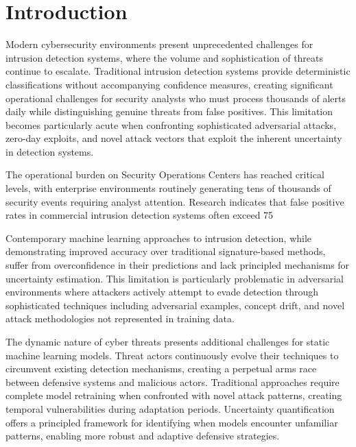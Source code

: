 \documentclass[journal]{IEEEtran}
\begin{document}
\section{Introduction}

Modern cybersecurity environments present unprecedented challenges for intrusion detection systems, where the volume and sophistication of threats continue to escalate. Traditional intrusion detection systems provide deterministic classifications without accompanying confidence measures, creating significant operational challenges for security analysts who must process thousands of alerts daily while distinguishing genuine threats from false positives. This limitation becomes particularly acute when confronting sophisticated adversarial attacks, zero-day exploits, and novel attack vectors that exploit the inherent uncertainty in detection systems.

The operational burden on Security Operations Centers has reached critical levels, with enterprise environments routinely generating tens of thousands of security events requiring analyst attention. Research indicates that false positive rates in commercial intrusion detection systems often exceed 75%

Contemporary machine learning approaches to intrusion detection, while demonstrating improved accuracy over traditional signature-based methods, suffer from overconfidence in their predictions and lack principled mechanisms for uncertainty estimation. This limitation is particularly problematic in adversarial environments where attackers actively attempt to evade detection through sophisticated techniques including adversarial examples, concept drift, and novel attack methodologies not represented in training data.

The dynamic nature of cyber threats presents additional challenges for static machine learning models. Threat actors continuously evolve their techniques to circumvent existing detection mechanisms, creating a perpetual arms race between defensive systems and malicious actors. Traditional approaches require complete model retraining when confronted with novel attack patterns, creating temporal vulnerabilities during adaptation periods. Uncertainty quantification offers a principled framework for identifying when models encounter unfamiliar patterns, enabling more robust and adaptive defensive strategies.
\end{document}
